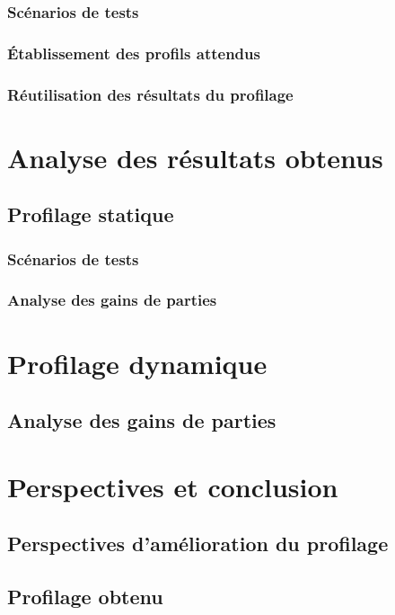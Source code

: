 \documentclass{report}
\begin{document}
\subsection{Scénarios de tests}
\subsection{Établissement des profils attendus}
\subsection{Réutilisation des résultats du profilage}


\chapter{Analyse des résultats obtenus}

\section{Profilage statique}
\subsection{Scénarios de tests}
\subsection{Analyse des gains de parties}

\chapter{Profilage dynamique}
\section{Analyse des gains de parties}


\chapter{Perspectives et conclusion}
\section{Perspectives d'amélioration du profilage}
\section{Profilage obtenu}
\end{document}
